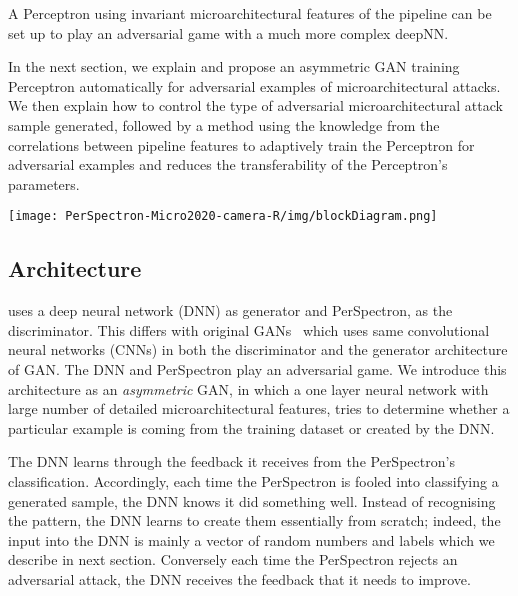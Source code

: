 \begin{note}

A Perceptron using invariant microarchitectural features of the pipeline can be set up to play an adversarial game with a much more complex deepNN. 

% 
\end{note}
 
In the next section, we explain \scheme and propose an asymmetric GAN training Perceptron automatically for adversarial examples of microarchitectural attacks. We then explain how to control the type of adversarial microarchitectural attack sample generated, followed by a method using the knowledge from the correlations between pipeline features to adaptively train the Perceptron for adversarial examples and reduces the transferability of the Perceptron's parameters. 

\begin{figure*}
\centering
\texttt{[image: PerSpectron-Micro2020-camera-R/img/blockDiagram.png]}

\caption{\scheme{}  }

\label{fig:algdiagram}
\end{figure*}

\subsection{{\scheme} Architecture}

{\scheme} uses a deep neural network (DNN) as generator and PerSpectron,  as the discriminator. This differs with original  GANs~\cite{goodfellow2014generative} which uses same convolutional neural
networks (CNNs) in both the discriminator and the generator
architecture of GAN.  The DNN and PerSpectron play an
adversarial game. We introduce this architecture as an {\em asymmetric} GAN, in which a one layer neural network with large number of detailed microarchitectural features, tries to determine whether a particular example is coming from the training dataset or created by the DNN. 

The DNN learns through the feedback it receives from the PerSpectron's classification. 
 Accordingly, each time the PerSpectron is fooled into classifying a generated sample, the DNN knows it did something well. Instead of recognising the pattern, the DNN learns to create them essentially from scratch; indeed, the input into the DNN is mainly a vector of random numbers and labels which we describe in next section.  Conversely each time the PerSpectron  rejects an adversarial attack, the DNN receives the feedback that it needs to improve.

